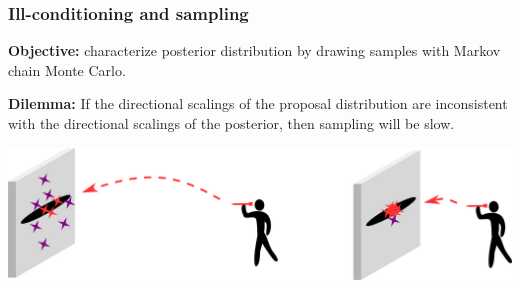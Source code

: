 \documentclass[10pt,final,xcolor=dvipsnames]{beamer}
\begin{document}
\begin{frame}
	\frametitle{Ill-conditioning and sampling} 
	\textbf{Objective:} characterize posterior distribution by drawing samples with Markov chain Monte Carlo.
	
	\vspace{0.5cm}
	\textbf{Dilemma:}
	If the directional scalings of the proposal distribution are inconsistent with the directional scalings of the posterior, then sampling will be slow.
	
	\vspace{0.5cm}
	\begin{center}
		\includegraphics[scale=0.23]{darts_combined.pdf}
	\end{center}
\end{frame}
\end{document}

